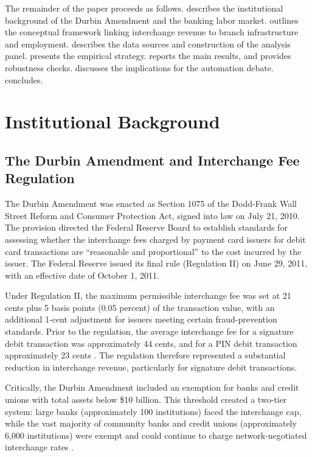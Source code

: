 \documentclass[12pt]{article}
\begin{document}
The remainder of the paper proceeds as follows.  describes the institutional background of the Durbin Amendment and the banking labor market.  outlines the conceptual framework linking interchange revenue to branch infrastructure and employment.  describes the data sources and construction of the analysis panel.  presents the empirical strategy.  reports the main results, and  provides robustness checks.  discusses the implications for the automation debate.  concludes.


\section{Institutional Background}\label{sec:background}

\subsection{The Durbin Amendment and Interchange Fee Regulation}

The Durbin Amendment was enacted as Section 1075 of the Dodd-Frank Wall Street Reform and Consumer Protection Act, signed into law on July 21, 2010. The provision directed the Federal Reserve Board to establish standards for assessing whether the interchange fees charged by payment card issuers for debit card transactions are ``reasonable and proportional'' to the cost incurred by the issuer. The Federal Reserve issued its final rule (Regulation II) on June 29, 2011, with an effective date of October 1, 2011.

Under Regulation II, the maximum permissible interchange fee was set at 21 cents plus 5 basis points (0.05 percent) of the transaction value, with an additional 1-cent adjustment for issuers meeting certain fraud-prevention standards. Prior to the regulation, the average interchange fee for a signature debit transaction was approximately 44 cents, and for a PIN debit transaction approximately 23 cents \citep{hayashi2012}. The regulation therefore represented a substantial reduction in interchange revenue, particularly for signature debit transactions.

Critically, the Durbin Amendment included an exemption for banks and credit unions with total assets below \$10 billion. This threshold created a two-tier system: large banks (approximately 100 institutions) faced the interchange cap, while the vast majority of community banks and credit unions (approximately 6,000 institutions) were exempt and could continue to charge network-negotiated interchange rates \citep{wang2014}.
\end{document}
